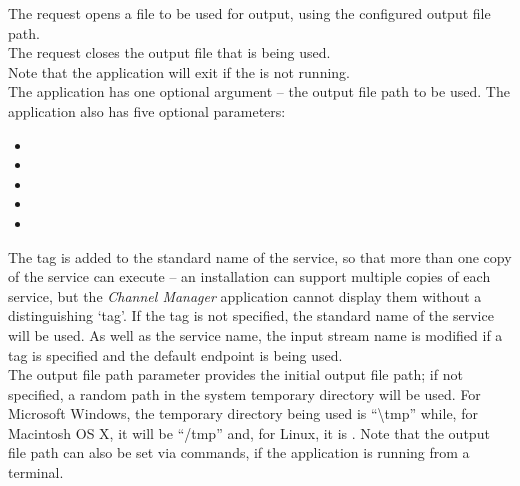 The  request opens a file to be
used for output, using the configured output file path.\\

The  request closes the output
file that is being used.\\

Note that the application will exit if the
 is not running.\\

The application has one optional argument -- the output file path to be used.
The application also has five optional parameters:
\begin{itemize}
\item {}
\item {}
\item {}
\item {}
\item {}
\end{itemize}
The tag is added to the standard name of the service, so that more than one copy of the
service can execute -- an \mplusm{} installation can support multiple copies of each
 service, but the \emph{Channel Manager} application cannot display them
without a distinguishing `tag'.
If the tag is not specified, the standard name of the service will be used.
As well as the service name, the input stream name is modified if a tag is specified and
the default endpoint is being used.\\

The output file path parameter provides the initial output file path; if not specified, a
random path in the system temporary directory will be used.
For Microsoft Windows, the temporary directory being used is ``\textbackslash{}tmp''
while, for Macintosh OS X, it will be ``/tmp'' and, for Linux, it is \TBD.
Note that the output file path can also be set via commands, if the application is
running from a terminal.\\

